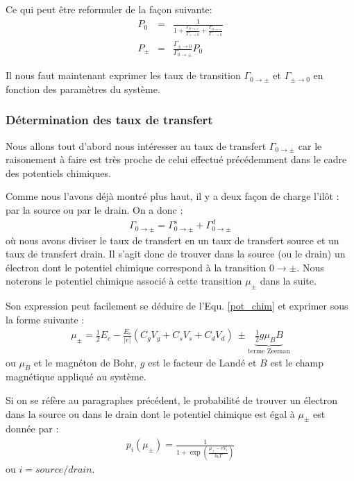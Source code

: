 Ce qui peut être reformuler de la façon suivante:
\begin{eqnarray}
P_0 &=& \frac{1}{1 + \frac{\Gamma_{0 \rightarrow +}}{\Gamma_{+ \rightarrow 0}} + \frac{\Gamma_{0 \rightarrow -}}{\Gamma_{- \rightarrow 0}}} \\
P_{\pm} &=& \frac{\Gamma_{\pm \rightarrow 0}}{\Gamma_{0 \rightarrow \pm}}P_0 
\end{eqnarray}


Il nous faut maintenant exprimer les taux de transition $\Gamma_{0 \rightarrow \pm}$ et $\Gamma_{\pm \rightarrow 0}$ en fonction des paramètres du système. 

\subsubsection{Détermination des taux de transfert}
Nous allons tout d'abord nous intéresser au taux de transfert $\Gamma_{0 \rightarrow \pm}$ car le raisonement à faire est très proche de celui effectué précédemment dans le cadre des potentiels chimiques. 

Comme nous l'avons déjà montré plus haut, il y a deux façon de charge l'ilôt : par la source ou par le drain. On a donc :
\begin{eqnarray}
\Gamma_{0 \rightarrow \pm} = \Gamma_{0 \rightarrow \pm}^s + \Gamma_{0 \rightarrow \pm}^d
\end{eqnarray}
où nous avons diviser le taux de transfert en un taux de transfert source et un taux de transfert drain. Il s'agit donc de trouver dans la source (ou le drain) un électron dont le potentiel chimique correspond à la transition $0\rightarrow \pm$. Nous noterons le potentiel chimique associé à cette transition $\mu_{\pm}$ dans la suite. 

Son expression peut facilement se déduire de l'Equ. \ref{pot_chim} et exprimer sous la forme suivante :
\begin{eqnarray}
\mu_{\pm} = \frac{1}{2}E_c - \frac{E_c}{|e|}(C_gV_g + C_sV_s + C_dV_d)~ \pm \underbrace{ \frac{1}{2}g \mu_B B}_{\text{terme Zeeman}}
\end{eqnarray}
ou  $\mu_B$ et le magnéton de Bohr, $g$ est le facteur de Landé et $B$ est le champ magnétique appliqué au système.

Si on se réfère au paragraphes précédent, le probabilité de trouver un électron dans la source ou dans le drain dont le potentiel chimique est égal à $\mu_{\pm}$ est donnée par :
\begin{eqnarray}
p_i(\mu_\pm) = \frac{1}{1 + \exp{(\frac{\mu_\pm - eV_i}{k_bT})}}
\end{eqnarray}
ou $i=source/drain$. 

